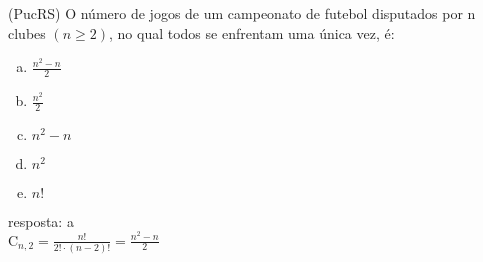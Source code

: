\begin{ex}
 (PucRS) O número de jogos de um campeonato de futebol disputados por n clubes $(n\geq 2)$, no qual todos se enfrentam uma única vez, é:
    \begin{enumerate}[(a)]
    \item $\frac{n^2-n}{2}$
    \item $\frac{n^2}{2}$
    \item $n^2-n$
    \item $n^2$
    \item $n!$
    \end{enumerate}
      \begin{sol}
       resposta: a \\
       $\mathrm{C}_{n,2}=\frac{n!}{2!\cdot(n-2)!}=\frac{n^2-n}{2}$
      \end{sol}
\end{ex}